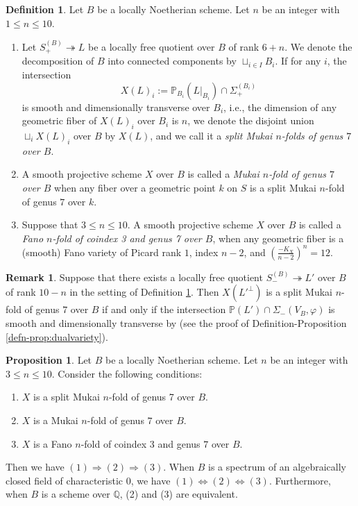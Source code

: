 \documentclass[autodetect-engine, a4paper]{amsart}
\theoremstyle{definition}
\newtheorem{prop}[thm]{Proposition}
\newtheorem{rem}[thm]{Remark}
\newtheorem{defn}[thm]{Definition}
\def\P{{\mathbb P}}
\def\Q{{\mathbb Q}}
\newcommand{\cred}{\color{black}}
\begin{document}
\begin{defn}
\label{defn:Mukaivariety}
Let $B$ be a locally Noetherian scheme.
Let $n$ be an integer with $1 \leq n \leq 10$.
\begin{enumerate}
\item 
Let $S_{+}^{(B)} \twoheadrightarrow L$ be a locally free quotient over $B$ of rank $6+n$.
{\cred We denote the decomposition of $B$ into connected components by $\sqcup_{i \in I} B_{i}.$
If for any $i$, the intersection
\[
X(L)_{i} := \P_{B_{i}}(L|_{B_{i}}) \cap \Sigma_{+}^{(B_{i})}
\]
is smooth and dimensionally transverse over $B_{i}$, i.e., the dimension of any geometric fiber of $X(L)_{i}$ over $B_{i}$ is $n$, we denote the disjoint union $\sqcup_{i} X(L)_{i}$ over $B$ by $X(L)$, and 
we call it a \emph{split Mukai $n$-folds of genus $7$ over $B$}.}

\item 
A smooth projective scheme $X$ over $B$ is called a \emph{Mukai $n$-fold of genus $7$ over $B$} when any fiber over a geometric point $k$ on $S$ is a split Mukai $n$-fold of genus $7$ over $k$.

\item 
Suppose that $3 \leq n \leq 10$.
A smooth projective scheme $X$ over $B$ is called a \emph{Fano $n$-fold of coindex 3 and genus 7 over $B$}, when any geometric fiber is a (smooth) Fano variety of Picard rank $1$, index $n-2$, and $(\frac{-K_{X}}{n-2})^n =12$.

\end{enumerate}
\end{defn}


\begin{rem}
\label{rem:mukaindual}
Suppose that there exists a locally free quotient $S_{-}^{(B)} \twoheadrightarrow L'$ over $B$ of rank $10 - n$
in the setting of Definition \ref{defn:Mukaivariety}.
Then $X(L'^{\perp})$ is a split Mukai $n$-fold of genus $7$ over $B$ if and only if the intersection
$ \P(L') \cap \Sigma_{-} (V_{B}, \varphi)$
is smooth and dimensionally transverse by \cite[Lemma 3.3]{Kuznetsovspinor} (see the proof of Definition-Proposition \ref{defn-prop:dualvariety}).
\end{rem}


\begin{prop}
\label{prop:MukaivssplitMukai}
Let $B$ be a locally Noetherian scheme. Let $n$ be an integer with $3 \leq n \leq 10$.
Consider the following conditions:
\begin{enumerate}
\item 
$X$ is a split Mukai $n$-fold of genus 7 over $B$.
\item 
$X$ is a Mukai $n$-fold of genus $7$ over $B$.
\item 
$X$ is a Fano $n$-fold of coindex 3 and genus $7$ over $B$.
\end{enumerate}
Then we have $(1) \Rightarrow (2) \Rightarrow (3)$.
When $B$ is a spectrum of an algebraically closed field of characteristic $0$, we have $(1) \Leftrightarrow (2) \Leftrightarrow (3)$. Furthermore, when $B$ is a scheme over $\Q$, (2) and (3) are equivalent.
\end{prop}
\end{document}
